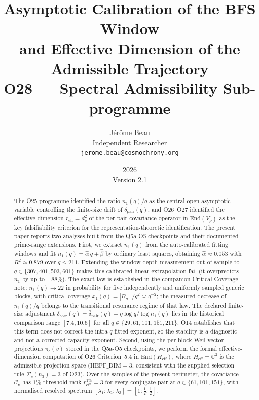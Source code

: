 \documentclass[11pt,a4paper]{article}
\title{Asymptotic Calibration of the BFS Window\\
and Effective Dimension of the Admissible Trajectory\\[4pt]
\large O28 --- Spectral Admissibility Sub-programme}
\author{J\'{e}r\^{o}me Beau\\
\small Independent Researcher\\
\small \texttt{jerome.beau@cosmochrony.org}}
\date{2026\\[2pt]\small Version 2.1}
\theoremstyle{definition}
\begin{document}
  \maketitle

  \begin{abstract}
    The O25 programme identified the ratio $n_1(q)/q$ as the central open
    asymptotic variable controlling the finite-size drift of $\bar{\delta}_{\mathrm{pair}}(q)$,
    and O26--O27 identified the effective dimension
    $r_{\mathrm{eff}} = d_\rho^2$ of the per-pair covariance operator in $\mathrm{End}(V_\rho)$
    as the key falsifiability criterion for the representation-theoretic identification.
    The present paper reports two analyses built from the Q5a-O5 checkpoints and their documented
    prime-range extensions.
    First, we extract $n_1(q)$ from the auto-calibrated fitting windows and fit
    $n_1(q) = \hat{\alpha}\,q + \hat{\beta}$ by ordinary least squares, obtaining
    $\hat{\alpha} \approx 0.053$ with $R^2 \approx 0.879$ over $q \le 211$.
    Extending the window-depth measurement out of sample to $q \in \{307, 401, 503, 601\}$ makes
    this calibrated linear extrapolation fail (it overpredicts $n_1$ by up to $+88\%$).
    The exact law is established in the companion Critical Coverage note: $n_1(q) \to 22$ in
    probability for five independently and uniformly sampled generic blocks, with critical
    coverage $x_1(q) = |B_{n_1}|/q^2 \asymp q^{-2}$; the measured decrease of $n_1(q)/q$ belongs
    to the transitional resonance regime of that law.
    The declared finite-size adjustment
    $\delta_{\mathrm{corr}}(q) = \bar{\delta}_{\mathrm{pair}}(q) - \eta\log q/\log n_1(q)$
    lies in the historical comparison range $[7.4, 10.6]$ for all $q \in \{29, 61, 101, 151, 211\}$;
    O14 establishes that this term
    does not correct the intra-$q$ fitted exponent, so the stability is a diagnostic and not a
    corrected capacity exponent.
    Second, using the per-block Weil vector projections $\pi_c(v)$ stored in the Q5a-O5
    checkpoints, we perform the formal effective-dimension computation of O26 Criterion~5.4
    in $\mathrm{End}(H_{\mathrm{eff}})$, where $H_{\mathrm{eff}} = \mathbb{C}^3$ is the
    admissible projection space ($\mathrm{HEFF\_DIM} = 3$, consistent with the supplied
    selection rule $\Sigma_c(n_3) = 3$ of O23).
    Over the samples of the present perimeter, the covariance $\mathcal{C}_c$ has $1\%$ threshold
    rank $r_{\mathrm{eff}}^{1\%} = 3$ for every conjugate pair at $q \in \{61, 101, 151\}$, with
    normalised resolved spectrum
    $[\lambda_1 : \lambda_2 : \lambda_3] = [1 : \tfrac{1}{2} : \tfrac{1}{2}]$.

\end{abstract}
\end{document}
